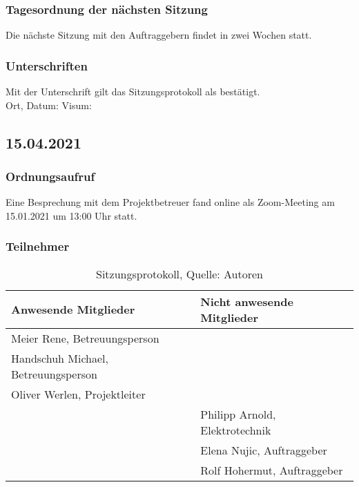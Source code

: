 \subsubsection{Tagesordnung der nächsten Sitzung}
Die nächste Sitzung mit den Auftraggebern findet in zwei Wochen statt. 
\subsubsection{Unterschriften}

Mit der Unterschrift gilt das Sitzungsprotokoll als bestätigt.\\

Ort, Datum:	\underline{\hspace*{6cm}}	\hspace*{1cm} Visum:	\underline{\hspace*{4cm}}

\subsection{15.04.2021}
\subsubsection{Ordnungsaufruf}
Eine Besprechung mit dem Projektbetreuer fand online als Zoom-Meeting am 15.01.2021 um 13:00 Uhr statt.
\subsubsection{Teilnehmer}
\begin{table}[H]
	\setlength\extrarowheight{2pt} %
	\begin{tabularx}{\textwidth}{|X|X|}
		\hline
		\textbf{Anwesende Mitglieder} &  \textbf{Nicht anwesende Mitglieder} \\
		\hline
		Meier Rene, Betreuungsperson &  \\
		Handschuh Michael, Betreuungsperson &   \\
		Oliver Werlen, Projektleiter &  \\
		& Philipp Arnold, Elektrotechnik  \\
		& Elena Nujic, Auftraggeber  \\
		& Rolf Hohermut, Auftraggeber  \\
		\hline
	\end{tabularx}
	\caption{ \label{tbl: Teilnehmerliste vom 15.04.2021}Sitzungsprotokoll, Quelle: Autoren}
\end{table}

